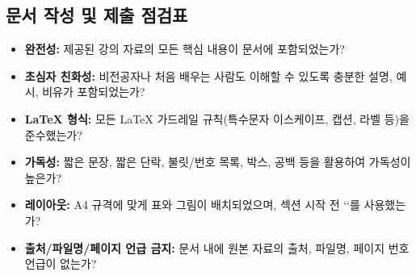 \documentclass[11pt,a4paper]{article}
\begin{document}
\subsection{문서 작성 및 제출 점검표}
\begin{itemize}
    \item \textbf{완전성:} 제공된 강의 자료의 모든 핵심 내용이 문서에 포함되었는가?
    \item \textbf{초심자 친화성:} 비전공자나 처음 배우는 사람도 이해할 수 있도록 충분한 설명, 예시, 비유가 포함되었는가?
    \item \textbf{LaTeX 형식:} 모든 LaTeX 가드레일 규칙(특수문자 이스케이프, 캡션, 라벨 등)을 준수했는가?
    \item \textbf{가독성:} 짧은 문장, 짧은 단락, 불릿/번호 목록, 박스, 공백 등을 활용하여 가독성이 높은가?
    \item \textbf{레이아웃:} A4 규격에 맞게 표와 그림이 배치되었으며, 섹션 시작 전 `\newpage`를 사용했는가?
    \item \textbf{출처/파일명/페이지 언급 금지:} 문서 내에 원본 자료의 출처, 파일명, 페이지 번호 언급이 없는가?
\end{itemize}
\end{document}
